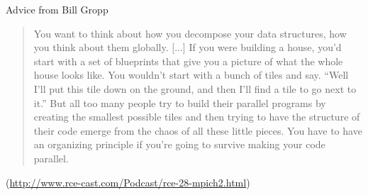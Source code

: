 \begin{frame}{Advice from Bill Gropp}
  \begin{quote}\large
    You want to think about how you decompose your data structures, how
    you think about them globally.  [...]  If you were building a house,
    you'd start with a set of blueprints that give you a picture of what
    the whole house looks like.  You wouldn't start with a bunch of
    tiles and say. ``Well I'll put this tile down on the ground, and
    then I'll find a tile to go next to it.''  But all too many people
    try to build their parallel programs by creating the smallest
    possible tiles and then trying to have the structure of their code
    emerge from the chaos of all these little pieces.  You have to have
    an organizing principle if you're going to survive making your code
    parallel.
  \end{quote}
  {\small \centering (\url{http://www.rce-cast.com/Podcast/rce-28-mpich2.html})}
\end{frame}

